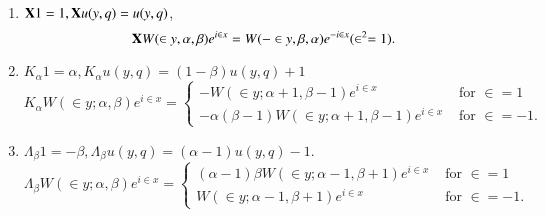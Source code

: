 \begin{lem}\label{chap4:lem7}
\begin{enumerate}
\item $\mathbf{X} 1 = 1, \mathbf{X} u (y,q) = u (y,q)$,
$$
\mathbf{X} W (\in y, \alpha, \beta) e^{i\in x} = W
(-\in y, \beta, \alpha) e^{-i\in x} (\in^2=1).
$$


\item $K_{\alpha}1=\alpha, K_{\alpha} u (y,q)=(1-\beta) u(y,q)+1$
{\fontsize{9}{11}\selectfont
$$ 
K_{\alpha} W (\in y ; \alpha, \beta) e^{i\in x} = 
\begin{cases}
-W(\in y; \alpha+1, \beta-1) e^{i\in x} & \text{ for }
\in =1\\
-\alpha(\beta-1) W (\in y; \alpha +1, \beta-1)e^{i\in
  x} & \text{ for } \in = -1.
\end{cases} 
$$}\relax

\item $\Lambda_{\beta}1 = -\beta, \Lambda_{\beta} u(y,q) = (\alpha-1)
  u(y,q)-1$.
{\fontsize{9}{11}\selectfont
$$
\Lambda_{\beta} W (\in y; \alpha, \beta) e^{i\in x} = 
\begin{cases}
(\alpha-1) \beta W (\in y ; \alpha -1, \beta+1)
  e^{i\in x} & \text{ for } \in =1\\
W(\in y ; \alpha-1, \beta +1)e^{i\in x} & \text{ for }
\in = -1.
\end{cases}
$$}\relax
\end{enumerate}
\end{lem}

